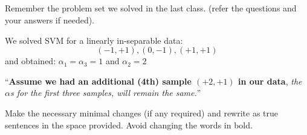 \begin{frame}
\section{}
Remember the problem set we solved in the last class. (refer the questions and your answers if needed).

We solved SVM for a linearly in-separable data:
\[ (-1,+1), (0,-1), (+1,+1) \]
and obtained:
$\alpha_1 = \alpha_3=1$ and $\alpha_2=2$

``{\bf Assume we had an additional (4th) sample $(+2,+1)$ in our data}, {\em the $\alpha$s for the first three samples, will remain the same.}''

Make the necessary minimal changes  (if any required) and rewrite as true sentences in the space provided. Avoid changing the words in bold.
\end{frame}

